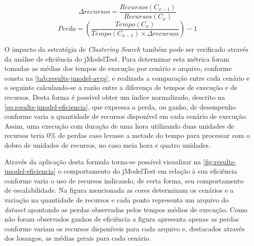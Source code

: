 \documentclass[english,brazilian]{UNISINOSmonografia} %
\begin{document}
\begin{equation}
\Delta{recursos} = \dfrac{Recursos(C_{x-1})}{Recursos(C_{x})}
\end{equation}
\begin{equation}\label{eq:results-jmodel-eficiencia}
Perda = 
\left(
	\dfrac
		{Tempo(C_{x})}
		{Tempo(C_{x-1}) \times \Delta{recursos}}
\right)-1
\end{equation}


O impacto da estratégia de \textit{Clustering Search} também pode ser verificado através da análise de eficiência do jModelTest.
%
Para determinar esta métrica foram tomadas as médias dos tempos de execução por cenário e arquivo, conforme consta na \autoref{tab:results-jmodel-avgs}, e realizada a comparação entre cada cenário e o seguinte calculando-se a razão entre a diferença de tempos de execução e de recursos.
%
Desta forma é possível obter um índice normalizado, descrito na \autoref{eq:results-jmodel-eficiencia}, que expressa a perda, ou ganho, de desempenho conforme varia a quantidade de recursos disponível em cada cenário de execução.
%
Assim, uma execução com duração de uma hora utilizando duas unidades de recursos teria 0\% de perdas caso levasse a metade do tempo para processar com o dobro de unidades de recursos, no caso meia hora e quatro unidades.



Através da aplicação desta formula torna-se possível visualizar na \autoref{fig:results-jmodel-eficiencia} o comportamento do jModelTest em relação à sua eficiência conforme varia o uso de recursos indicando, de certa forma, seu comportamento de escalabilidade.
%
Na figura mencionada as cores determinam os cenários e a variação na quantidade de recursos e cada ponto representa um arquivo do \textit{dataset} apontando as perdas observadas pelos tempos médios de execução.
%
Como não foram observados ganhos de eficiência a figura apresenta apenas as perdas conforme variam os recursos disponíveis para cada arquivo e, destacados através dos losangos, as médias gerais para cada cenário.
\end{document}
